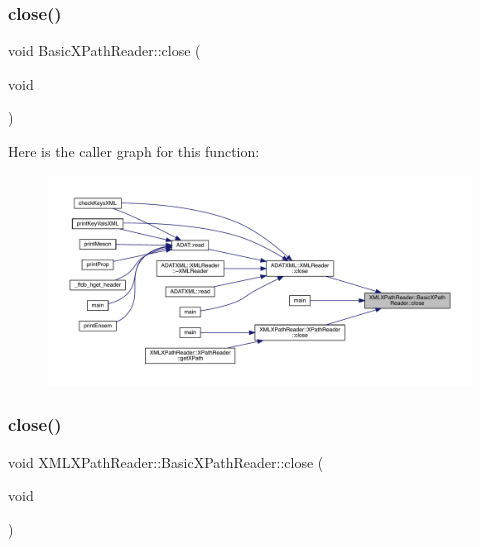 \subsubsection{\texorpdfstring{close()}{close()}\hspace{0.1cm}{\footnotesize\ttfamily [1/3]}}
{\footnotesize\ttfamily void Basic\+X\+Path\+Reader\+::close (\begin{DoxyParamCaption}\item[{void}]{ }\end{DoxyParamCaption})}

Here is the caller graph for this function\+:
\nopagebreak
\begin{figure}[H]
\begin{center}
\leavevmode
\includegraphics[width=350pt]{d6/dbf/classXMLXPathReader_1_1BasicXPathReader_acd03bd5e585de0a5077544314cd8fb9a_icgraph}
\end{center}
\end{figure}
\mbox{\label{classXMLXPathReader_1_1BasicXPathReader_acab41ee6353e8d7289d9c28828f9ceb6}} 
\subsubsection{\texorpdfstring{close()}{close()}\hspace{0.1cm}{\footnotesize\ttfamily [2/3]}}
{\footnotesize\ttfamily void X\+M\+L\+X\+Path\+Reader\+::\+Basic\+X\+Path\+Reader\+::close (\begin{DoxyParamCaption}\item[{void}]{ }\end{DoxyParamCaption})}

\mbox{\label{classXMLXPathReader_1_1BasicXPathReader_acab41ee6353e8d7289d9c28828f9ceb6}} 
